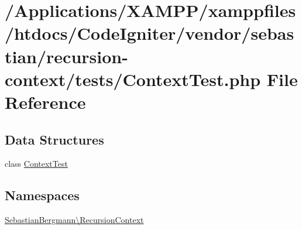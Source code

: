 \hypertarget{_context_test_8php}{}\section{/\+Applications/\+X\+A\+M\+P\+P/xamppfiles/htdocs/\+Code\+Igniter/vendor/sebastian/recursion-\/context/tests/\+Context\+Test.php File Reference}
\label{_context_test_8php}
\subsection*{Data Structures}
\begin{DoxyCompactItemize}
\item 
class \mbox{\hyperlink{class_sebastian_bergmann_1_1_recursion_context_1_1_context_test}{Context\+Test}}
\end{DoxyCompactItemize}
\subsection*{Namespaces}
\begin{DoxyCompactItemize}
\item 
 \mbox{\hyperlink{namespace_sebastian_bergmann_1_1_recursion_context}{Sebastian\+Bergmann\textbackslash{}\+Recursion\+Context}}
\end{DoxyCompactItemize}
